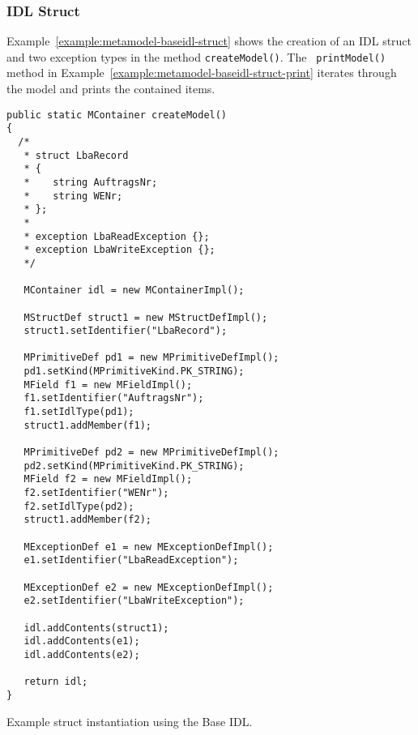 \subsubsection{IDL Struct}

Example~\ref{example:metamodel-baseidl-struct} shows the creation of an IDL
struct and two exception types in the method {\tt createModel()}. The {\tt
printModel()} method in Example~\ref{example:metamodel-baseidl-struct-print}
iterates through the model and prints the contained items.

\begin{Example}
\begin{minifbox}
\begin{verbatim}
public static MContainer createModel()
{
  /*
   * struct LbaRecord
   * {
   *    string AuftragsNr;
   *    string WENr;
   * };
   *
   * exception LbaReadException {};
   * exception LbaWriteException {};
   */

   MContainer idl = new MContainerImpl();

   MStructDef struct1 = new MStructDefImpl();
   struct1.setIdentifier("LbaRecord");

   MPrimitiveDef pd1 = new MPrimitiveDefImpl();
   pd1.setKind(MPrimitiveKind.PK_STRING);
   MField f1 = new MFieldImpl();
   f1.setIdentifier("AuftragsNr");
   f1.setIdlType(pd1);
   struct1.addMember(f1);

   MPrimitiveDef pd2 = new MPrimitiveDefImpl();
   pd2.setKind(MPrimitiveKind.PK_STRING);
   MField f2 = new MFieldImpl();
   f2.setIdentifier("WENr");
   f2.setIdlType(pd2);
   struct1.addMember(f2);

   MExceptionDef e1 = new MExceptionDefImpl();
   e1.setIdentifier("LbaReadException");

   MExceptionDef e2 = new MExceptionDefImpl();
   e2.setIdentifier("LbaWriteException");

   idl.addContents(struct1);
   idl.addContents(e1);
   idl.addContents(e2);

   return idl;
}
\end{verbatim}
\end{minifbox}
\caption{Example struct instantiation using the Base IDL.}
\label{example:metamodel-baseidl-struct}
\end{Example}

